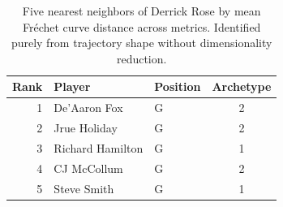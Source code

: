 \begin{table}[htbp]
  \centering\small
  \begin{tabular}{rllc}
    \toprule
    Rank & Player & Position & Archetype \\
    \midrule
    1 & De'Aaron Fox & G & 2 \\
    2 & Jrue Holiday & G & 2 \\
    3 & Richard Hamilton & G & 1 \\
    4 & CJ McCollum & G & 2 \\
    5 & Steve Smith & G & 1 \\
    \bottomrule
  \end{tabular}
  \caption{Five nearest neighbors of Derrick Rose by mean Fr\'{e}chet curve distance across metrics. Identified purely from trajectory shape without dimensionality reduction.}
  \label{tab:Derrick_Rose_frechet_curve_neighbors}
\end{table}

